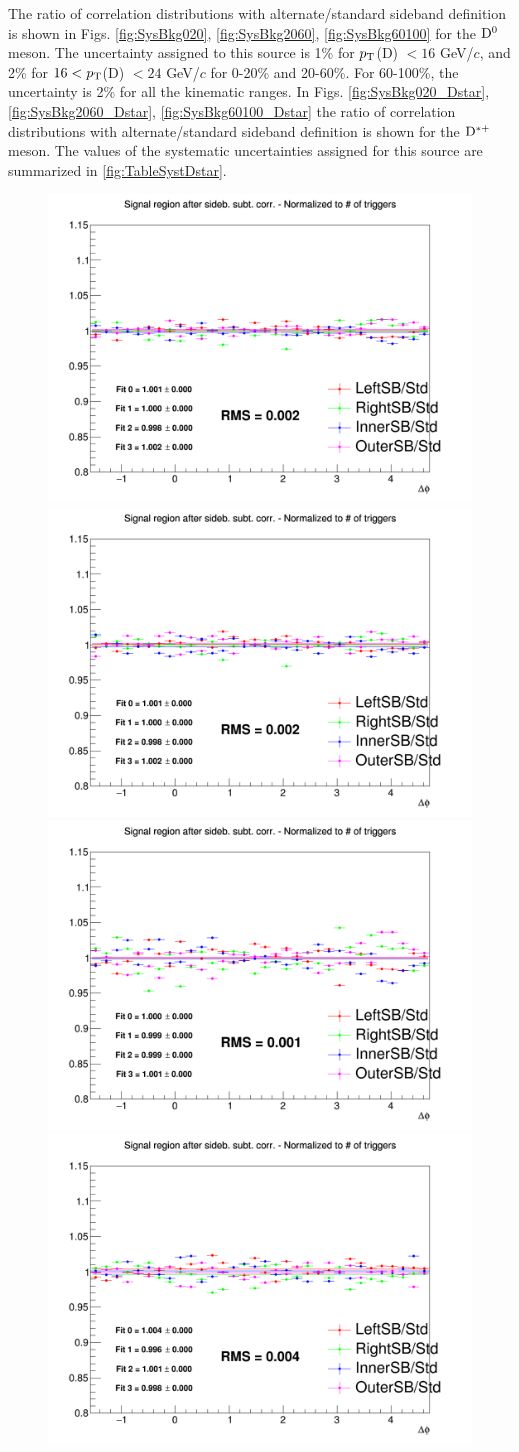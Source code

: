 The ratio of correlation distributions with alternate/standard sideband definition is shown in Figs. \ref{fig:SysBkg020}, \ref{fig:SysBkg2060}, \ref{fig:SysBkg60100} for the ${\rm D^0}$ meson. The uncertainty assigned to this source is 1\% for $p_{\rm T}$(D) $< 16$ GeV/$c$, and 2\% for $16 < p_{\rm T}$(D) $< 24$ GeV/$c$ for 0-20\% and 20-60\%. For 60-100\%, the uncertainty is 2\% for all the kinematic ranges.
In Figs. \ref{fig:SysBkg020_Dstar}, \ref{fig:SysBkg2060_Dstar}, \ref{fig:SysBkg60100_Dstar} the ratio of correlation distributions with alternate/standard sideband definition is shown for the ${\rm D^{*+}}$ meson. The values of the systematic uncertainties assigned for this source are summarized in \ref{fig:TableSystDstar}.

\begin{figure}
\centering
{\includegraphics[width=0.31\linewidth]{figuresVsCent/Dzero/SystSideb/020/Ratio_AzimCorrDistr_Dzero_Canvas_PtIntBins4to5_PoolInt_thr03to99.png}}
{\includegraphics[width=0.31\linewidth]{figuresVsCent/Dzero/SystSideb/020/Ratio_AzimCorrDistr_Dzero_Canvas_PtIntBins4to5_PoolInt_thr03to1.png}}
{\includegraphics[width=0.31\linewidth]{figuresVsCent/Dzero/SystSideb/020/Ratio_AzimCorrDistr_Dzero_Canvas_PtIntBins4to5_PoolInt_thr1to99.png}} \\
{\includegraphics[width=0.31\linewidth]{figuresVsCent/Dzero/SystSideb/020/Ratio_AzimCorrDistr_Dzero_Canvas_PtIntBins6to8_PoolInt_thr03to99.png}}

\end{figure}
